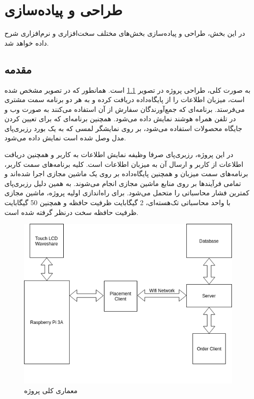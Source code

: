 \chapter{طراحی و پیاده‌سازی}
در این بخش، طراحی و پیاده‌سازی بخش‌های مختلف سخت‌افزاری و نرم‌افزاری شرح داده خواهد شد.
\section{مقدمه}به صورت کلی، طراحی پروژه در تصویر \ref{arc1} است. همانطور که در تصویر مشخص شده است، میزبان اطلاعات را از پایگاه‌داده دریافت کرده و به هر دو برنامه سمت مشتری می‌فرستد. برنامه‌ای که جمع‌آورندگان سفارش از آن استفاده می‌کنند به صورت وب و در تلفن همراه هوشند نمایش داده می‌شود. همچنین برنامه‌ای که برای تعیین کردن جایگاه محصولات استفاده می‌شود، بر روی نمایشگر لمسی که به یک بورد رزبری‌پای مدل  وصل شده است نمایش داده می‌شود.

در این پروژه، رزبری‌پای صرفا وظیفه نمایش اطلاعات به کاربر و همچنین دریافت اطلاعات از کاربر و ارسال آن به میزبان اطلاعات است. کلیه برنامه‌های سمت کاربر، برنامه‌های سمت میزبان و همچنین پایگاه‌داده بر روی یک ماشین مجازی اجرا شده‌اند و تمامی فرآیندها بر روی منابع ماشین مجازی انجام می‌شوند. به همین دلیل رزبری‌پای کمترین فشار محاسباتی را متحمل می‌شود.
برای راه‌اندازی اولیه پروژه، ماشین مجازی با واحد محاسباتی تک‌هسته‌ای، 2 گیگابایت ظرفیت حافظه و همچنین 50 گیگابایت ظرفیت حافظه سخت درنظر گرفته شده است.
\begin{figure}[t!]
    \centering
    \includegraphics[scale=0.75]{figures/pro.png}
    \caption{معماری کلی پروژه}
    \label{arc1}
\end{figure}

